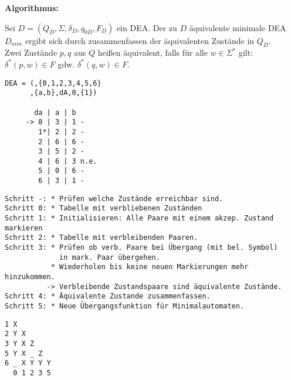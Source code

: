 \documentclass[11pt,
			a4paper,
			parskip=full,
			toc=bib,
			toc=idx,
			toc=listof,
			ngerman
			listof=totoc,]{scrartcl}
\newcommand{\concept}[1]{%
	\sf{%
		\textbf{%
				\textcolor{mymauve}{#1}%
		}%
	}%
	\rm%
}
\newenvironment{algo}[1]%
{	\begin{framed}
	\textbf{Algorithmus:} \concept{#1}}%
{\end{framed}}
\newenvironment{expl}%
{\color{red}}
{\color{black}}
\newcommand{\compress}{\vspace{-1em}}
\begin{document}
\newpage
\begin{algo}{Minimierung von Automaten (Markierungsalgorithmus)}

\compress
Sei $D=(Q_D,Σ,δ_D,q_{0D},F_D)$ ein DEA. Der zu $D$ äquivalente minimale DEA $D_{min}$
ergibt sich durch zusammenfassen der äquivalenten Zustände in $Q_D$.\\
Zwei Zustände $p,q$ aus $Q$ heißen äquivalent, falls für alle $w \in Σ^*$ gilt:
$δ^*(p,w)\in F$ gdw. $δ^*(q,w)\in F$.
\end{algo}

\compress
\begin{expl}
\begin{minipage}[t]{1\linewidth}
  \begin{minipage}[t]{0.25\linewidth}
    \begin{verbatim}
DEA = (,{0,1,2,3,4,5,6}
      ,{a,b},dA,0,{1})

       da | a | b
     -> 0 | 3 | 1 -
        1*| 2 | 2 -
        2 | 6 | 6 -
        3 | 5 | 2 -
        4 | 6 | 3 n.e.
        5 | 0 | 6 -
        6 | 3 | 1 -
    \end{verbatim}
  \end{minipage}
  \begin{minipage}[t]{0.7\linewidth}
    \begin{verbatim}
Schritt -: * Prüfen welche Zustände erreichbar sind.
Schritt 0: * Tabelle mit verbliebenen Zuständen  
Schritt 1: * Initialisieren: Alle Paare mit einem akzep. Zustand markieren
Schritt 2: * Tabelle mit verbleibenden Paaren.
Schritt 3: * Prüfen ob verb. Paare bei Übergang (mit bel. Symbol) 
             in mark. Paar übergehen.
           * Wiederholen bis keine neuen Markierungen mehr hinzukommen.
          -> Verbleibende Zustandspaare sind äquivalente Zustände.
Schritt 4: * Äquivalente Zustande zusammenfassen.
Schritt 5: * Neue Übergangsfunktion für Minimalautomaten. 
    \end{verbatim}
  \end{minipage}
\end{minipage}
\compress
\begin{minipage}[t]{1\linewidth}
  \begin{minipage}[t]{0.2\linewidth}
    \begin{verbatim}
1 X        
2 Y X      
3 Y X Z    
5 Y X _ Z  
6 _ X Y Y Y  
  0 1 2 3 5
  

\end{verbatim}
\end{minipage}
\end{minipage}
\end{expl}
\end{document}
